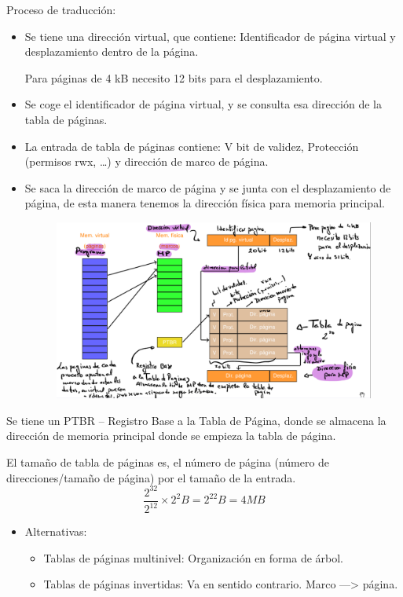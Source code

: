 \documentclass[12pt, twoside, openright]{report} %
\begin{document}
    Proceso de traducción:
    \begin{itemize}

  \item Se tiene una dirección virtual, que contiene: Identificador de
    página virtual y desplazamiento dentro de la página.

    Para páginas de 4 kB necesito 12 bits para el desplazamiento.

    
    
    \item
      Se coge el identificador de página virtual, y se consulta esa
      dirección de la tabla de páginas.
    \item
      La entrada de tabla de páginas contiene: V bit de validez,
      Protección (permisos rwx, \ldots) y dirección de marco de página.
  \item
    Se saca la dirección de marco de página y se junta con el
    desplazamiento de página, de esta manera tenemos la dirección física
    para memoria principal.
    \begin{figure}[H]
      {\includegraphics[scale=.35]{Untitled 30.png}}
    \end{figure}
  \end{itemize}
  Se tiene un PTBR -- Registro Base a la Tabla de Página, donde se
  almacena la dirección de memoria principal donde se empieza la tabla
  de página.

  El tamaño de tabla de páginas es, el número de página (número de
  direcciones/tamaño de página) por el tamaño de la entrada.
$$\frac{2^{32}}{2^{12}} \times 2^2 B = 2^22 B = 4 MB$$
  \begin{itemize}
    \item Alternativas:
    \begin{itemize}
      \item Tablas de páginas multinivel: Organización en forma de árbol.
      \item Tablas de páginas invertidas: Va en sentido contrario. Marco —> página.
    \end{itemize}
    
  \end{itemize}
\end{document}
